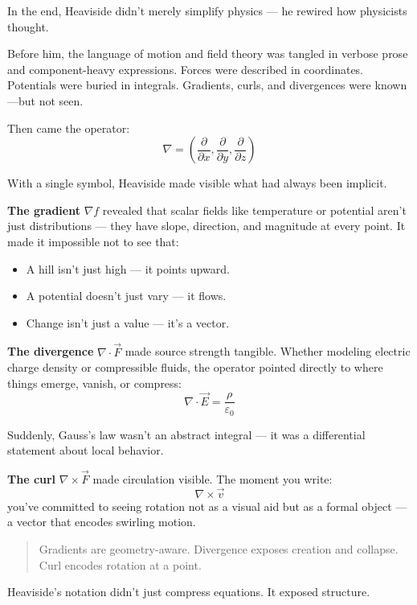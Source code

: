 In the end, Heaviside didn’t merely simplify physics —  
he rewired how physicists thought.

Before him, the language of motion and field theory was tangled in verbose prose and component-heavy expressions. Forces were described in coordinates. Potentials were buried in integrals. Gradients, curls, and divergences were known—but not seen.

Then came the operator:
\[
\nabla = \left( \frac{\partial}{\partial x}, \frac{\partial}{\partial y}, \frac{\partial}{\partial z} \right)
\]

With a single symbol, Heaviside made visible what had always been implicit.

\bigskip

\textbf{The gradient} \( \nabla f \) revealed that scalar fields like temperature or potential aren’t just distributions — they have slope, direction, and magnitude at every point. It made it impossible not to see that:
\begin{itemize}
    \item A hill isn’t just high — it points upward.
    \item A potential doesn’t just vary — it flows.
    \item Change isn’t just a value — it’s a vector.
\end{itemize}

\textbf{The divergence} \( \nabla \cdot \vec{F} \) made source strength tangible. Whether modeling electric charge density or compressible fluids, the operator pointed directly to where things emerge, vanish, or compress:
\[
\nabla \cdot \vec{E} = \frac{\rho}{\varepsilon_0}
\]

Suddenly, Gauss’s law wasn’t an abstract integral — it was a differential statement about local behavior.

\textbf{The curl} \( \nabla \times \vec{F} \) made circulation visible. The moment you write:
\[
\nabla \times \vec{v}
\]
you’ve committed to seeing rotation not as a visual aid but as a formal object — a vector that encodes swirling motion.

\bigskip

\begin{quote}
    Gradients are geometry-aware.  
    Divergence exposes creation and collapse.  
    Curl encodes rotation at a point.
\end{quote}

\bigskip

Heaviside’s notation didn’t just compress equations.  
It exposed structure.

